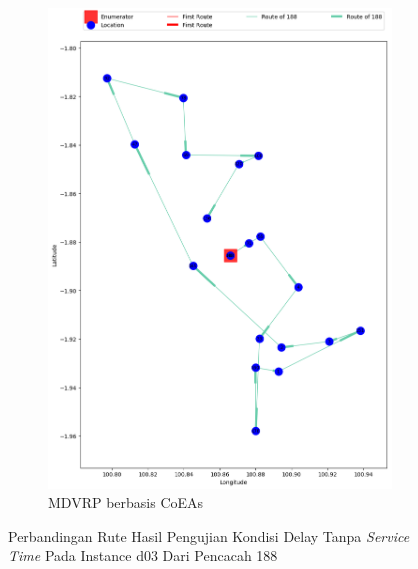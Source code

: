 \begin{figure}[H]
	\centering
	\begin{subfigure}[t]{\textwidth}
		\centering
		\includegraphics[width=\textwidth]{Resources/Images/delayed_3/real_m15_n100_delayed_3_188_coes}
		\caption{MDVRP berbasis CoEAs}
		\label{fig:real_m15_n100_delayed_3_188_coes}
	\end{subfigure}
	\caption{Perbandingan Rute Hasil Pengujian Kondisi Delay Tanpa \textit{Service Time} Pada Instance d03 Dari Pencacah 188}
	\label{fig:real_m15_n100_delayed_3_188}
\end{figure}


